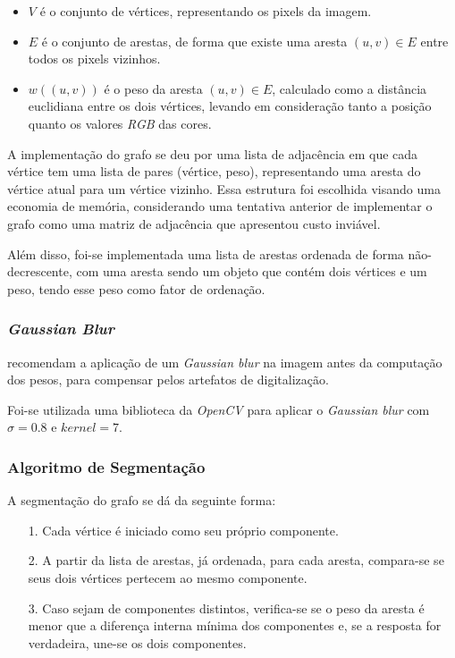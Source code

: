 \documentclass[12pt]{article}
\begin{document}
\begin{itemize}
    \item $V$ é o conjunto de vértices, representando os pixels da imagem.
    \item $E$ é o conjunto de arestas, de forma que existe uma aresta $(u,v) \in E$ entre todos os pixels vizinhos.
    \item $w((u,v))$ é o peso da aresta $(u,v) \in E$, calculado como a distância euclidiana entre os dois vértices, levando em consideração tanto a posição quanto os valores \textit{RGB} das cores.
\end{itemize}

A implementação do grafo se deu por uma lista de adjacência em que cada vértice tem uma lista de pares (vértice, peso), representando uma aresta do vértice atual para um vértice vizinho. Essa estrutura foi escolhida visando uma economia de memória, considerando uma tentativa anterior de implementar o grafo como uma matriz de adjacência que apresentou custo inviável.

Além disso, foi-se implementada uma lista de arestas ordenada de forma não-decrescente, com uma aresta sendo um objeto que contém dois vértices e um peso, tendo esse peso como fator de ordenação.

\subsubsection{\textit{Gaussian Blur}}
\cite{Felzenszwalb2004} recomendam a aplicação de um \textit{Gaussian blur} na imagem antes da computação dos pesos, para compensar pelos artefatos de digitalização.

Foi-se utilizada uma biblioteca da \textit{OpenCV} para aplicar o \textit{Gaussian blur} com $\sigma = 0.8$ e $kernel = 7$.

\subsubsection{Algoritmo de Segmentação}
A segmentação do grafo se dá da seguinte forma:
\begin{itemize}
    \item[1.] Cada vértice é iniciado como seu próprio componente.
    \item[2.] A partir da lista de arestas, já ordenada, para cada aresta, compara-se se seus dois vértices pertecem ao mesmo componente.
    \item[3.] Caso sejam de componentes distintos, verifica-se se o peso da aresta é menor que a diferença interna mínima dos componentes e, se a resposta for verdadeira, une-se os dois componentes.
\end{itemize}
\end{document}
